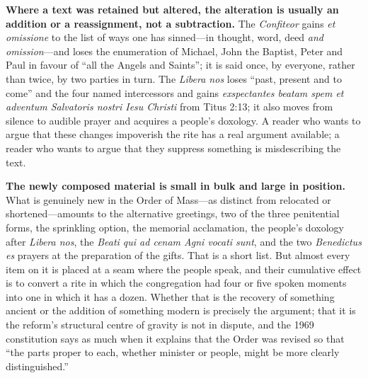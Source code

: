 \textbf{Where a text was retained but altered, the alteration is usually an addition or a reassignment, not a subtraction.} The \emph{Confiteor} gains \emph{et omissione} to the list of ways one has sinned---in thought, word, deed \emph{and omission}---and loses the enumeration of Michael, John the Baptist, Peter and Paul in favour of ``all the Angels and Saints''; it is said once, by everyone, rather than twice, by two parties in turn. The \emph{Libera nos} loses ``past, present and to come'' and the four named intercessors and gains \emph{exspectantes beatam spem et adventum Salvatoris nostri Iesu Christi} from Titus 2:13; it also moves from silence to audible prayer and acquires a people's doxology. A reader who wants to argue that these changes impoverish the rite has a real argument available; a reader who wants to argue that they suppress something is misdescribing the text.

\textbf{The newly composed material is small in bulk and large in position.} What is genuinely new in the Order of Mass---as distinct from relocated or shortened---amounts to the alternative greetings, two of the three penitential forms, the sprinkling option, the memorial acclamation, the people's doxology after \emph{Libera nos}, the \emph{Beati qui ad cenam Agni vocati sunt}, and the two \emph{Benedictus es} prayers at the preparation of the gifts. That is a short list. But almost every item on it is placed at a seam where the people speak, and their cumulative effect is to convert a rite in which the congregation had four or five spoken moments into one in which it has a dozen. Whether that is the recovery of something ancient or the addition of something modern is precisely the argument; that it is the reform's structural centre of gravity is not in dispute, and the 1969 constitution says as much when it explains that the Order was revised so that ``the parts proper to each, whether minister or people, might be more clearly distinguished.''

